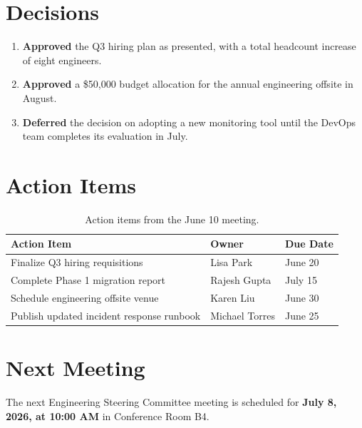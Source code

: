 \documentclass[
    language=english,
    doctype=memo,
    institution=none,
]{../../omnilatex}
\begin{document}
\section*{Decisions}

\begin{enumerate}
    \item \textbf{Approved} the Q3 hiring plan as presented, with a total headcount
          increase of eight engineers.
    \item \textbf{Approved} a \$50{,}000 budget allocation for the annual
          engineering offsite in August.
    \item \textbf{Deferred} the decision on adopting a new monitoring tool until
          the DevOps team completes its evaluation in July.
\end{enumerate}

\section*{Action Items}

\begin{table}[h]
    \centering
    \begin{tabular}{lll}
        \toprule
        \textbf{Action Item} & \textbf{Owner} & \textbf{Due Date} \\
        \midrule
        Finalize Q3 hiring requisitions     & Lisa Park    & June 20 \\
        Complete Phase 1 migration report   & Rajesh Gupta & July 15 \\
        Schedule engineering offsite venue  & Karen Liu    & June 30 \\
        Publish updated incident response runbook & Michael Torres & June 25 \\
        \bottomrule
    \end{tabular}
    \caption{Action items from the June 10 meeting.}
\end{table}

\section*{Next Meeting}

The next Engineering Steering Committee meeting is scheduled for
\textbf{July 8, 2026, at 10:00 AM} in Conference Room B4.
\end{document}

